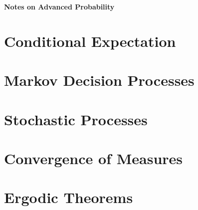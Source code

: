 \documentclass[11pt,a4paper]{book}
\begin{document}
\frontmatter
\begin{titlepage}
\centering
{\Large \textbf{Notes on Advanced Probability}\par}
\end{titlepage}

\tableofcontents

\mainmatter

\part{Conditional Expectation}





\part{Markov Decision Processes}




\part{Stochastic Processes}






\part{Convergence of Measures}



\part{Ergodic Theorems}


\end{document}
